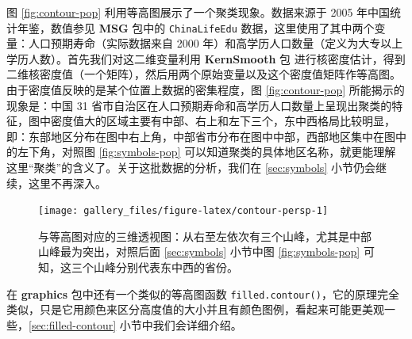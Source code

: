 \documentclass[
  b5paper,
  UTF8,twoside]{book}
\newenvironment{Shaded}{\begin{snugshade}}{\end{snugshade}}
\newcommand{\AttributeTok}[1]{\textcolor[rgb]{0.77,0.63,0.00}{#1}}
\newcommand{\CommentTok}[1]{\textcolor[rgb]{0.56,0.35,0.01}{\textit{#1}}}
\newcommand{\ConstantTok}[1]{\textcolor[rgb]{0.00,0.00,0.00}{#1}}
\newcommand{\DecValTok}[1]{\textcolor[rgb]{0.00,0.00,0.81}{#1}}
\newcommand{\FloatTok}[1]{\textcolor[rgb]{0.00,0.00,0.81}{#1}}
\newcommand{\FunctionTok}[1]{\textcolor[rgb]{0.00,0.00,0.00}{#1}}
\newcommand{\NormalTok}[1]{#1}
\newcommand{\SpecialCharTok}[1]{\textcolor[rgb]{0.00,0.00,0.00}{#1}}
\newcommand{\StringTok}[1]{\textcolor[rgb]{0.31,0.60,0.02}{#1}}
\begin{document}
图 \ref{fig:contour-pop}
利用等高图展示了一个聚类现象。数据来源于 2005 年中国统计年鉴，数值参见 \textbf{MSG} 包中的 \texttt{ChinaLifeEdu} 数据，这里使用了其中两个变量：人口预期寿命（实际数据来自 2000 年）和高学历人口数量（定义为大专以上学历人数）。首先我们对这二维变量利用 \textbf{KernSmooth} 包 \citep{KernSmooth} 进行核密度估计，得到二维核密度值（一个矩阵），然后用两个原始变量以及这个密度值矩阵作等高图。由于密度值反映的是某个位置上数据的密集程度，图 \ref{fig:contour-pop} 所能揭示的现象是：中国 31 省市自治区在人口预期寿命和高学历人口数量上呈现出聚类的特征，图中密度值大的区域主要有中部、右上和左下三个，东中西格局比较明显，即：东部地区分布在图中右上角，中部省市分布在图中中部，西部地区集中在图中的左下角，对照图 \ref{fig:symbols-pop} 可以知道聚类的具体地区名称，就更能理解这里``聚类''的含义了。关于这批数据的分析，我们在 \ref{sec:symbols} 小节仍会继续，这里不再深入。





\begin{Shaded}
\end{Shaded}

\begin{figure}

{\centering \texttt{[image: gallery\_files/figure-latex/contour-persp-1]} 

}

\caption[与等高图对应的三维透视图]{与等高图对应的三维透视图：从右至左依次有三个山峰，尤其是中部山峰最为突出，对照后面 \ref{sec:symbols} 小节中图 \ref{fig:symbols-pop} 可知，这三个山峰分别代表东中西的省份。}\label{fig:contour-persp}
\end{figure}

在 \textbf{graphics} 包中还有一个类似的等高图函数 \texttt{filled.contour()}，它的原理完全类似，只是它用颜色来区分高度值的大小并且有颜色图例，看起来可能更美观一些，\ref{sec:filled-contour} 小节中我们会详细介绍。
\end{document}
